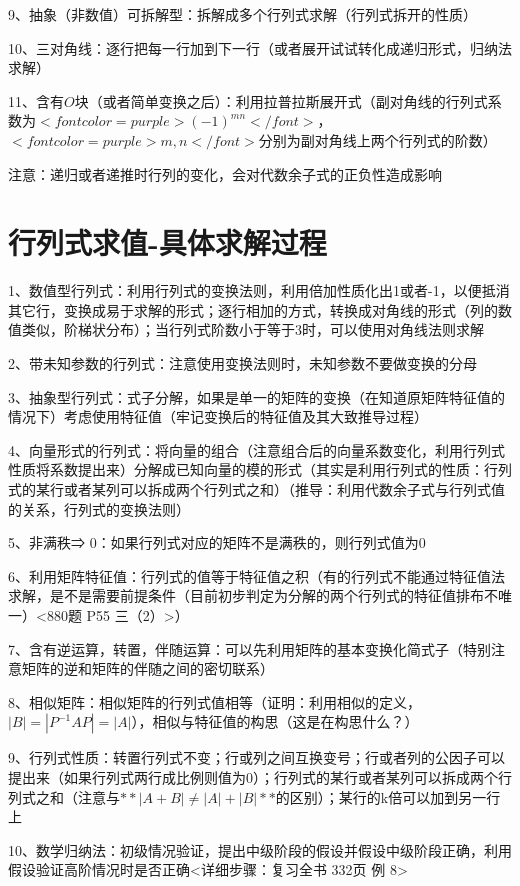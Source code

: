9、抽象（非数值）可拆解型：拆解成多个行列式求解（行列式拆开的性质）

10、三对角线：逐行把每一行加到下一行（或者展开试试转化成递归形式，归纳法求解）

11、含有$ O $块（或者简单变换之后）：利用拉普拉斯展开式（副对角线的行列式系数为$ <font color=purple>(-1)^{mn}</font> $，$ <font color=purple>m,n</font> $分别为副对角线上两个行列式的阶数）

注意：递归或者递推时行列的变化，会对代数余子式的正负性造成影响

\section{行列式求值-具体求解过程}

1、数值型行列式：利用行列式的变换法则，利用倍加性质化出1或者-1，以便抵消其它行，变换成易于求解的形式；逐行相加的方式，转换成对角线的形式（列的数值类似，阶梯状分布）；当行列式阶数小于等于3时，可以使用对角线法则求解

2、带未知参数的行列式：注意使用变换法则时，未知参数不要做变换的分母

3、抽象型行列式：式子分解，如果是单一的矩阵的变换（在知道原矩阵特征值的情况下）考虑使用特征值（牢记变换后的特征值及其大致推导过程）

4、向量形式的行列式：将向量的组合（注意组合后的向量系数变化，利用行列式性质将系数提出来）分解成已知向量的模的形式（其实是利用行列式的性质：行列式的某行或者某列可以拆成两个行列式之和）（推导：利用代数余子式与行列式值的关系，行列式的变换法则）

5、非满秩⇒ 0：如果行列式对应的矩阵不是满秩的，则行列式值为0

6、利用矩阵特征值：行列式的值等于特征值之积（有的行列式不能通过特征值法求解，是不是需要前提条件（目前初步判定为分解的两个行列式的特征值排布不唯一）<880题 P55 三（2）>）

7、含有逆运算，转置，伴随运算：可以先利用矩阵的基本变换化简式子（特别注意矩阵的逆和矩阵的伴随之间的密切联系）

8、相似矩阵：相似矩阵的行列式值相等（证明：利用相似的定义，$ |B|=|P^{-1}AP|=|A| $），相似与特征值的构思（这是在构思什么？）

9、行列式性质：转置行列式不变；行或列之间互换变号；行或者列的公因子可以提出来（如果行列式两行成比例则值为0）；行列式的某行或者某列可以拆成两个行列式之和（注意与$ **|A+B|\ne |A|+|B|** $的区别）；某行的k倍可以加到另一行上

10、数学归纳法：初级情况验证，提出中级阶段的假设并假设中级阶段正确，利用假设验证高阶情况时是否正确<详细步骤：复习全书 332页 例 8>

